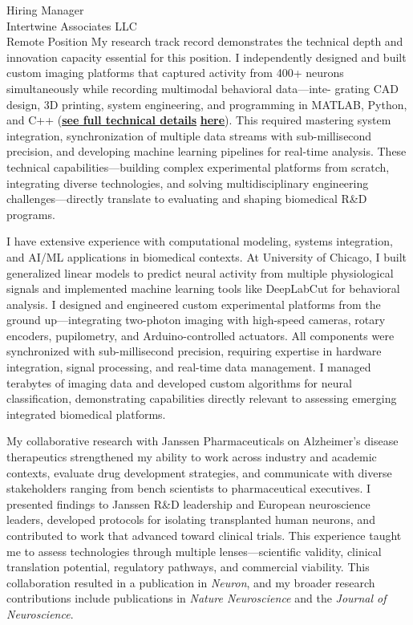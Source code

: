 \documentclass[11pt]{letter}
\begin{document}
\begin{letter}{
Hiring Manager \\
Intertwine Associates LLC \\
Remote Position
}
\newpage
My research track record demonstrates the technical depth and innovation capacity essential for this position. I independently designed and built custom imaging platforms that captured activity from 400+ neurons simultaneously while recording multimodal behavioral data—inte- grating CAD design, 3D printing, system engineering, and programming in MATLAB, Python, and C++ (\href{https://lambot.co/project/chapter2/}{\underline{\textbf{see full technical details}}} \href{https://lambot.co/project/chapter2/}{\underline{\textbf{here}}}). This required mastering system integration, synchronization of multiple data streams with sub-millisecond precision, and developing machine learning pipelines for real-time analysis. These technical capabilities—building complex experimental platforms from scratch, integrating diverse technologies, and solving multidisciplinary engineering challenges—directly translate to evaluating and shaping biomedical R\&D programs.

I have extensive experience with computational modeling, systems integration, and AI/ML applications in biomedical contexts. At University of Chicago, I built generalized linear models to predict neural activity from multiple physiological signals and implemented machine learning tools like DeepLabCut for behavioral analysis. I designed and engineered custom experimental platforms from the ground up—integrating two-photon imaging with high-speed cameras, rotary encoders, pupilometry, and Arduino-controlled actuators. All components were synchronized with sub-millisecond precision, requiring expertise in hardware integration, signal processing, and real-time data management. I managed terabytes of imaging data and developed custom algorithms for neural classification, demonstrating capabilities directly relevant to assessing emerging integrated biomedical platforms.

My collaborative research with Janssen Pharmaceuticals on Alzheimer's disease therapeutics strengthened my ability to work across industry and academic contexts, evaluate drug development strategies, and communicate with diverse stakeholders ranging from bench scientists to pharmaceutical executives. I presented findings to Janssen R\&D leadership and European neuroscience leaders, developed protocols for isolating transplanted human neurons, and contributed to work that advanced toward clinical trials. This experience taught me to assess technologies through multiple lenses—scientific validity, clinical translation potential, regulatory pathways, and commercial viability. This collaboration resulted in a publication in \textit{Neuron}, and my broader research contributions include publications in \textit{Nature Neuroscience} and the \textit{Journal of Neuroscience}.


\end{letter}
\end{document}
